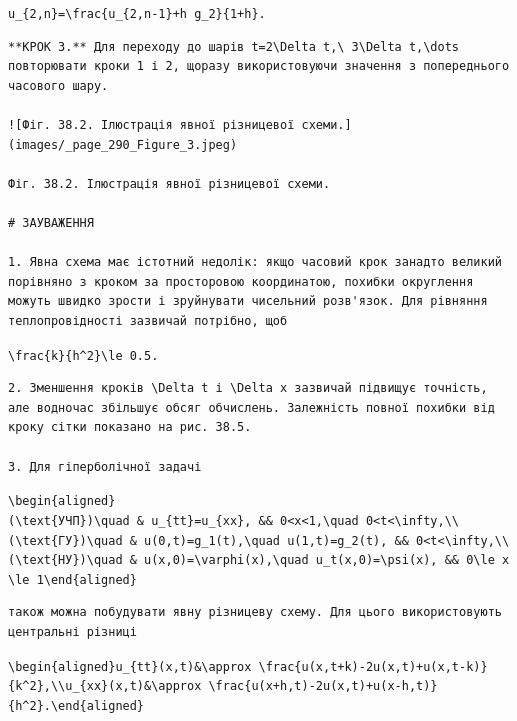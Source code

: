 \documentclass[
  ukrainian,
]{article}
\begin{document}
\texttt{u\_\{2,n\}=\textbackslash{}frac\{u\_\{2,n-1\}+h\ g\_2\}\{1+h\}.}

\begin{verbatim}
**КРОК 3.** Для переходу до шарів t=2\Delta t,\ 3\Delta t,\dots повторювати кроки 1 і 2, щоразу використовуючи значення з попереднього часового шару.

![Фіг. 38.2. Ілюстрація явної різницевої схеми.](images/_page_290_Figure_3.jpeg)

Фіг. 38.2. Ілюстрація явної різницевої схеми.

# ЗАУВАЖЕННЯ

1. Явна схема має істотний недолік: якщо часовий крок занадто великий порівняно з кроком за просторовою координатою, похибки округлення можуть швидко зрости і зруйнувати чисельний розв'язок. Для рівняння теплопровідності зазвичай потрібно, щоб
\end{verbatim}

\texttt{\textbackslash{}frac\{k\}\{h\^{}2\}\textbackslash{}le\ 0.5.}

\begin{verbatim}
2. Зменшення кроків \Delta t і \Delta x зазвичай підвищує точність, але водночас збільшує обсяг обчислень. Залежність повної похибки від кроку сітки показано на рис. 38.5.

3. Для гіперболічної задачі
\end{verbatim}

\texttt{\textbackslash{}begin\{aligned\}(\textbackslash{}text\{УЧП\})\textbackslash{}quad\ \&\ u\_\{tt\}=u\_\{xx\},\ \&\&\ 0\textless{}x\textless{}1,\textbackslash{}quad\ 0\textless{}t\textless{}\textbackslash{}infty,\textbackslash{}\textbackslash{}(\textbackslash{}text\{ГУ\})\textbackslash{}quad\ \&\ u(0,t)=g\_1(t),\textbackslash{}quad\ u(1,t)=g\_2(t),\ \&\&\ 0\textless{}t\textless{}\textbackslash{}infty,\textbackslash{}\textbackslash{}(\textbackslash{}text\{НУ\})\textbackslash{}quad\ \&\ u(x,0)=\textbackslash{}varphi(x),\textbackslash{}quad\ u\_t(x,0)=\textbackslash{}psi(x),\ \&\&\ 0\textbackslash{}le\ x\textbackslash{}le\ 1\textbackslash{}end\{aligned\}}

\begin{verbatim}
також можна побудувати явну різницеву схему. Для цього використовують центральні різниці
\end{verbatim}

\texttt{\textbackslash{}begin\{aligned\}u\_\{tt\}(x,t)\&\textbackslash{}approx\ \textbackslash{}frac\{u(x,t+k)-2u(x,t)+u(x,t-k)\}\{k\^{}2\},\textbackslash{}\textbackslash{}u\_\{xx\}(x,t)\&\textbackslash{}approx\ \textbackslash{}frac\{u(x+h,t)-2u(x,t)+u(x-h,t)\}\{h\^{}2\}.\textbackslash{}end\{aligned\}}
\end{document}
